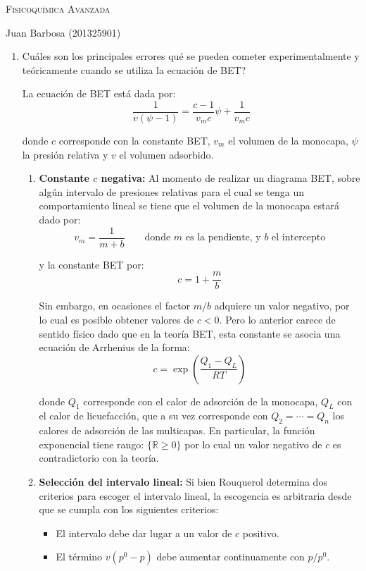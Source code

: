 \documentclass[12pt]{article}
\title{}
\author{}
\begin{document}
	\begin{center}
		\scshape
		Fisicoquímica Avanzada
		
		Juan Barbosa (201325901)
	\end{center}
	\begin{enumerate}
		\item Cuáles son los principales errores qué se pueden cometer experimentalmente y teóricamente cuando se utiliza la ecuación de BET?
		
		La ecuación de BET está dada por:
		\begin{equation}
			\dfrac{1}{v(\psi - 1)} = \dfrac{c-1}{v_mc}\psi + \dfrac{1}{v_mc}
		\end{equation}
		
		donde $c$ corresponde con la constante BET, $v_m$ el volumen de la monocapa, $\psi$ la presión relativa y $v$ el volumen adsorbido.
		\begin{enumerate}
			\item \textbf{Constante $c$ negativa:} Al momento de realizar un diagrama BET, sobre algún intervalo de presiones relativas para el cual se tenga un comportamiento lineal se tiene que el volumen de la monocapa estará dado por:
			\begin{equation}
				v_m = \dfrac{1}{m + b} \qquad \text{donde $m$ es la pendiente, y $b$ el intercepto}
			\end{equation}
			
			y la constante BET por:
			\begin{equation}
				c = 1 + \dfrac{m}{b}
			\end{equation}
			
			Sin embargo, en ocasiones el factor $m/b$ adquiere un valor negativo, por lo cual es posible obtener valores de $c < 0$. Pero lo anterior carece de sentido físico dado que en la teoría BET, esta constante se asocia una ecuación de Arrhenius de la forma:
			\begin{equation}\label{arrhenius}
				c = \exp\left(\dfrac{Q_1 - Q_L}{RT}\right)
			\end{equation}
			
			donde $Q_1$ corresponde con el calor de adsorción de la monocapa, $Q_L$ con el calor de licuefacción, que a su vez corresponde con $Q_2 = \cdots = Q_n$ los calores de adsorción de las multicapas. En particular, la función exponencial tiene rango: $\{\mathbb{R} \geq 0\}$ por lo cual un valor negativo de $c$ es contradictorio con la teoría.
			
			\item \textbf{Selección del intervalo lineal:} Si bien Rouquerol determina dos criterios para escoger el intervalo lineal, la escogencia es arbitraria desde que se cumpla con los siguientes criterios:
			\begin{itemize}
				\item El intervalo debe dar lugar a un valor de $c$ positivo.
				\item El término $v(p^0 - p)$ debe aumentar continuamente con $p/p^0$.
			\end{itemize}
			

\end{enumerate}
\end{enumerate}
\end{document}
